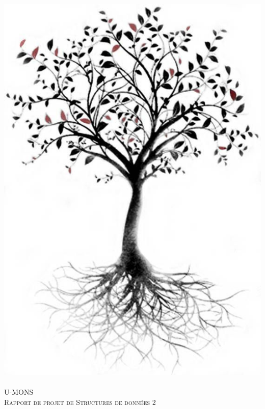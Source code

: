 \documentclass[10pt,a4paper]{article}
\begin{document}
\pagestyle{fancy}
\fancyhf{}
\cfoot{\thepage}

\begin{titlepage}
  \begin{sffamily}
  \begin{center}

    \includegraphics[scale=0.15]{images/tree.jpg}~\\[1.5cm]

    \textsc{\LARGE U-MONS}\\[2cm]

    \textsc{\Large Rapport de projet de Structures de données 2}\\[1.5cm]


\end{center}
\end{sffamily}
\end{titlepage}
\end{document}
